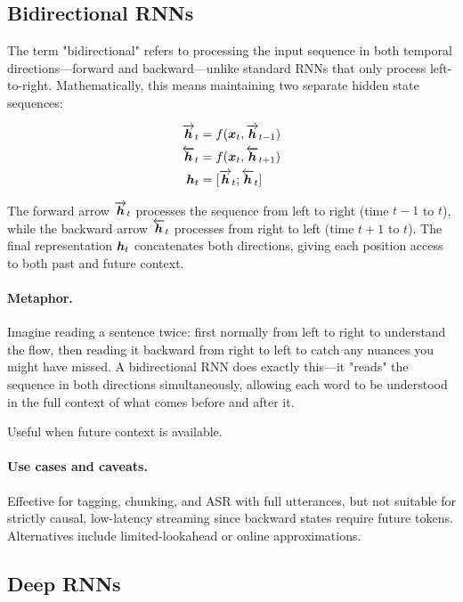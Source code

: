 \subsection{Bidirectional RNNs}

The term "bidirectional" refers to processing the input sequence in both temporal directions—forward and backward—unlike standard RNNs that only process left-to-right. Mathematically, this means maintaining two separate hidden state sequences:

\begin{align}
\overrightarrow{\boldsymbol{h}}_t &= f(\boldsymbol{x}_t, \overrightarrow{\boldsymbol{h}}_{t-1}) \\
\overleftarrow{\boldsymbol{h}}_t &= f(\boldsymbol{x}_t, \overleftarrow{\boldsymbol{h}}_{t+1}) \\
\boldsymbol{h}_t &= [\overrightarrow{\boldsymbol{h}}_t; \overleftarrow{\boldsymbol{h}}_t]
\end{align}

The forward arrow $\overrightarrow{\boldsymbol{h}}_t$ processes the sequence from left to right (time $t-1$ to $t$), while the backward arrow $\overleftarrow{\boldsymbol{h}}_t$ processes from right to left (time $t+1$ to $t$). The final representation $\boldsymbol{h}_t$ concatenates both directions, giving each position access to both past and future context.

\paragraph{Metaphor.} Imagine reading a sentence twice: first normally from left to right to understand the flow, then reading it backward from right to left to catch any nuances you might have missed. A bidirectional RNN does exactly this—it "reads" the sequence in both directions simultaneously, allowing each word to be understood in the full context of what comes before and after it.

Useful when future context is available.

\paragraph{Use cases and caveats.} Effective for tagging, chunking, and ASR with full utterances, but not suitable for strictly causal, low-latency streaming since backward states require future tokens. Alternatives include limited-lookahead or online approximations.

\subsection{Deep RNNs}

